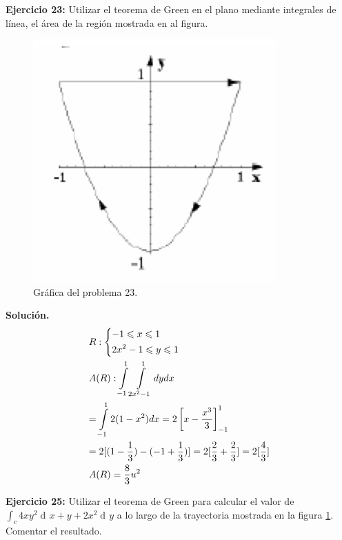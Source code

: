 \documentclass[12pt]{article}
\DeclareMathOperator{\di}{d\!}
\begin{document}
\vspace{5mm}

\noindent \textbf{Ejercicio 23:} Utilizar el teorema de Green en el plano mediante integrales de línea, el área de la región mostrada en al figura.
\begin{figure}[!htbp] 
	\label{ej25}
	\centering
	\includegraphics[scale = 1]{problema23.png}
	\caption{Gráfica del problema 23.}
\end{figure}
\vspace{5mm}
\noindent \textbf{Solución.}
\vspace{5mm}
\[\begin{gathered}
  R:\left\{ \begin{gathered}
   - 1 \leqslant x \leqslant 1 \hfill \\
  2{x^2} - 1 \leqslant y \leqslant 1 \hfill \\ 
\end{gathered}  \right. \hfill \\
  A(R):\int\limits_{ - 1}^1 {\int\limits_{2{x^2} - 1}^1 {dydx} }  \hfill \\
   = \int\limits_{ - 1}^1 {2(1 - {x^2})dx}  = 2\left[ {x - \frac{{{x^3}}}{3}} \right]_{ - 1}^1 \hfill \\
   = 2[(1 - \frac{1}{3}) - ( - 1 + \frac{1}{3})] = 2[\frac{2}{3} + \frac{2}{3}] = 2[\frac{4}{3}] \hfill \\
  A(R) = \frac{8}{3}{u^2} \hfill \\ 
\end{gathered} \]



\noindent \textbf{Ejercicio 25:}  Utilizar el teorema de Green para calcular el valor de
$\int_c 4xy^2 \di x + y+2x^2 \di y$ a lo largo de la trayectoria mostrada en la figura \ref{ej25}. Comentar el resultado.
\end{document}
